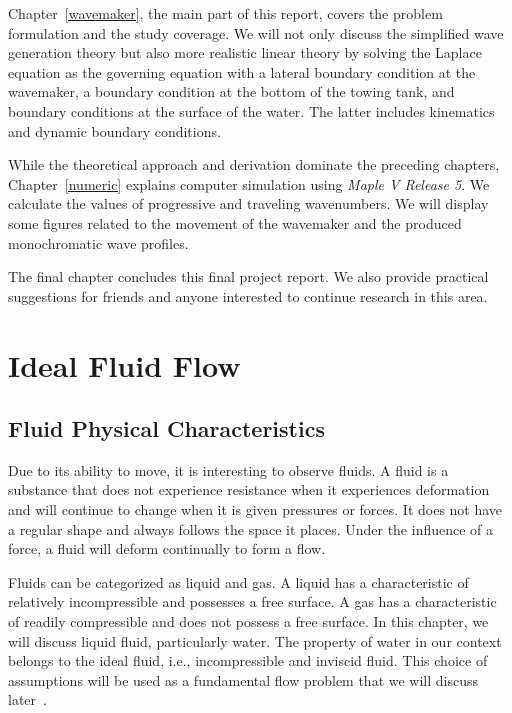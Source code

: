\documentclass[12pt,a4paper]{report}
\begin{document}
Chapter~\ref{wavemaker}, the main part of this report, covers the problem formulation and the study coverage. We will not only discuss the simplified wave generation theory but also more realistic linear theory by solving the Laplace equation as the governing equation with a lateral boundary condition at the wavemaker, a boundary condition at the bottom of the towing tank, and boundary conditions at the surface of the water. The latter includes kinematics and dynamic boundary conditions.

While the theoretical approach and derivation dominate the preceding chapters, Chapter~\ref{numeric} explains computer simulation using {\slshape Maple V Release 5}. We calculate the values of progressive and traveling wavenumbers. We will display some figures related to the movement of the wavemaker and the produced monochromatic wave profiles.

The final chapter concludes this final project report. We also provide practical suggestions for friends and anyone interested to continue research in this area.

\chapter{Ideal Fluid Flow}    \label{ideal}

\section{Fluid Physical Characteristics}

Due to its ability to move, it is interesting to observe fluids.
A fluid is a substance that does not experience resistance when it experiences deformation and will continue to change when it is given pressures or forces.
It does not have a regular shape and always follows the space it places.
Under the influence of a force, a fluid will deform continually to form a flow.

Fluids can be categorized as liquid and gas. A liquid has a characteristic of relatively incompressible and possesses a free surface.
A gas has a characteristic of readily compressible and does not possess a free surface.
In this chapter, we will discuss liquid fluid, particularly water.
The property of water in our context belongs to the ideal fluid, i.e., incompressible and inviscid fluid.
This choice of assumptions will be used as a fundamental flow problem that we will discuss later~\cite{rs,wlh}.
\end{document}
